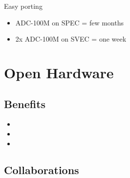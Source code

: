 \documentclass[compress,red]{beamer}
\begin{document}
\begin{frame}{Easy porting}

  \begin{block}{}
    \begin{itemize}
    \item
      ADC-100M on SPEC = few months
    \item
      2x ADC-100M on SVEC = one week
    \end{itemize}
  \end{block}

\end{frame}


\section{Open Hardware}

\subsection{Benefits}

\begin{frame}{}

  \begin{block}{}
    \begin{itemize}
    \item
    \item
    \item
    \end{itemize}
  \end{block}

\end{frame}

\subsection{Collaborations}

\end{document}
